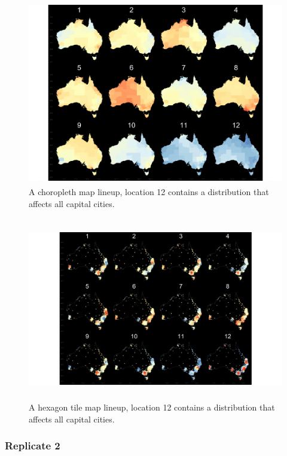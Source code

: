 \documentclass{monashthesis}
\begin{document}
\begin{figure}[H]
\centering
\includegraphics[height=8cm]{lineups/cities-geo12-1.pdf}
\caption{\label{fig:cities-geo12}A choropleth map lineup, location 12 contains a distribution that affects all capital cities.}
\end{figure}

\begin{figure}[H]
\centering
\includegraphics[height=8cm]{lineups/cities-hex12.pdf}
\caption{\label{fig:cities-hex12}A hexagon tile map lineup, location 12 contains a distribution that affects all capital cities.}
\end{figure}

\hypertarget{replicate-2}{%
\subsubsection{Replicate 2}\label{replicate-2}}
\end{document}
